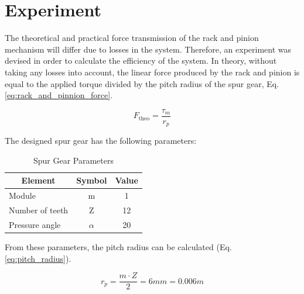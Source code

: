 \section{Experiment}
The theoretical and practical force transmission of the rack and pinion mechanism will differ due to losses in the system. Therefore, an experiment was devised in order to calculate the efficiency of the system. In theory, without taking any losses into account, the linear force produced by the rack and pinion is equal to the applied torque divided by the pitch radius of the spur gear, Eq. \ref{eq:rack_and_pinnion_force}.

\begin{equation}
  F_{\text{theo}} = \frac{\tau_m}{r_p}
  \label{eq:rack_and_pinnion_force}
\end{equation}

\noindent
The designed spur gear has the following parameters:

\begin{table}[ht]
  \setlength{\abovecaptionskip}{6pt}
  \centering
  \begin{tabular}{|l|c|c|}
  \hline
  \multicolumn{1}{|c|}{\textbf{Element}} & \textbf{Symbol}                  & \textbf{Value} \\ \hline
  Module              & m               & 1        \\ \hline
  Number of teeth              & Z               & 12        \\ \hline
  Pressure angle              & $\alpha$               & 20        \\ \hline
  \end{tabular}
  \caption{Spur Gear Parameters}
  \label{table:spur_gear_parameters}
\end{table}

\noindent
From these parameters, the pitch radius can be calculated (Eq. \ref{eq:pitch_radius}).

\begin{equation}
  r_{p} = \frac{m \cdot Z}{2} = 6mm = 0.006m
  \label{eq:pitch_radius}
\end{equation}

